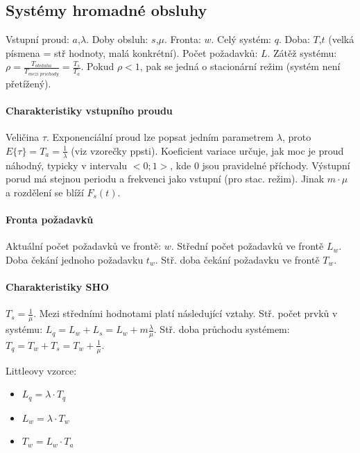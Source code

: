 \documentclass[11pt,a4paper]{scrartcl}
\begin{document}
	\subsection{Systémy hromadné obsluhy}
	Vstupní proud: $a$,$\lambda$. Doby obsluh: $s$,$\mu$. Fronta: $w$. Celý systém: $q$. Doba: $T$,$t$ (velká písmena = stř hodnoty, malá konkrétní). Počet požadavků: $L$. Zátěž systému: $
	\rho = 
	\frac{T_{obsluha}}{T_{mezi \; prichody}} = \frac{T_s}{T_a}$. Pokud $\rho < 1$, pak se jedná o stacionární režim (systém není přetížený).
	
	\paragraph{Charakteristiky vstupního proudu}
	Veličina $\tau$. Exponenciální proud lze popsat jedním parametrem $\lambda$, proto $E\{\tau\} = T_a = \frac{1}{\lambda}$ (viz vzorečky ppsti). Koeficient variace určuje, jak moc je proud náhodný, typicky v intervalu $<0;1>$, kde $0$ jsou pravidelné příchody. Výstupní porud má stejnou periodu a frekvenci jako vstupní (pro stac. režim). Jinak $m\cdot\mu$ a rozdělení se blíží $F_s(t)$.
	
	\paragraph{Fronta požadavků}
	Aktuální počet požadavků ve frontě: $w$. Střední počet požadavků ve frontě $L_w$. Doba čekání jednoho požadavku $t_w$. Stř. doba čekání požadavku ve frontě $T_w$. 

	\paragraph{Charakteristiky SHO} $T_s = \frac{1}{\mu}$. Mezi středními hodnotami platí následující vztahy.
	Stř. počet prvků v systému: $L_q = L_w + L_s = L_w + m\frac{\lambda}{\mu}$.
	Stř. doba průchodu systémem: $T_q = T_w + T_s = T_w + \frac{1}{\mu}$.
	
	Littleovy vzorce:
	\begin{itemize}
		\item $L_q = \lambda \cdot T_q$
		\item $L_w = \lambda \cdot T_w$
		\item $T_w = L_w \cdot T_a$
	\end{itemize}
	
	
\end{document}
